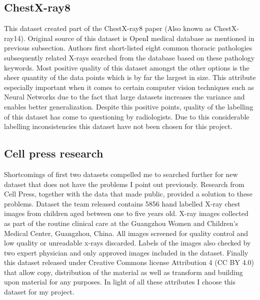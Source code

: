 \documentclass[12pt, twoside, a4paper]{article}
\begin{document}
\subsection{ChestX-ray8}
This dataset created part of the ChestX-ray8\cite{ChestX-ray8} paper (Also known as ChestX-ray14). Original source of this dataset is OpenI\cite{openi} medical database as mentioned in previous subsection. Authors first short-listed eight common thoracic pathologies subsequently related X-rays searched from the database based on these pathology keywords. Most positive quality of this dataset amongst the other options is the sheer quantity of the data points which is by far the largest in size. This attribute especially important when it comes to certain computer vision techniques such as Neural Networks due to the fact that large datasets increases the variance and enables better generalization. Despite this positive points, quality of the labelling of this dataset has come to questioning by radiologists\cite{counterray8}. Due to this considerable labelling inconsistencies this dataset have not been chosen for this project.

\subsection{Cell press research}
Shortcomings of first two datasets compelled me to searched further for new dataset that does not have the problems I point out previously. Research from Cell Press\cite{dataset}, together with the data that made public, provided a solution to these problems. Dataset the team released contains 5856 hand labelled X-ray chest images from children aged between one to five years old. X-ray images collected as part of the routine clinical care at the Guangzhou Women and Children’s Medical Center, Guangzhou, China. All images screened for quality control and low quality or unreadable x-rays discarded. Labels of the images also checked by two expert physician and only approved images included in the dataset. Finally this dataset released under Creative Commons license Attribution 4 (CC BY 4.0) that allow copy, distribution of the material as well as transform and building upon material for any purposes. In light of all these attributes I choose this dataset for my project.

\clearpage
\end{document}
